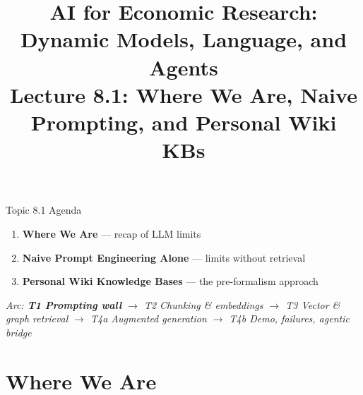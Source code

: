 


\usetikzlibrary{arrows.meta, positioning, shapes.geometric, fit, calc, backgrounds, decorations.pathreplacing}

\graphicspath{{./pic/}{./figures/}{../../MiniCourse_8hr/Slides/Module4_Agentic_AI/pic/}{../}}

\title[AI for Econ Research]{AI for Economic Research: Dynamic Models, Language, and Agents\\
Lecture 8.1: Where We Are, Naive Prompting, and Personal Wiki KBs}



\makebeamertitle

\begin{frame}{Topic 8.1 Agenda}
\begin{enumerate}
  \item \textbf{Where We Are} --- recap of LLM limits
  \medskip
  \item \textbf{Naive Prompt Engineering Alone} --- limits without retrieval
  \medskip
  \item \textbf{Personal Wiki Knowledge Bases} --- the pre-formalism approach
\end{enumerate}

\medskip
\textit{Arc: \textbf{T1 Prompting wall} $\to$ T2 Chunking \& embeddings $\to$ T3 Vector \& graph retrieval $\to$ T4a Augmented generation $\to$ T4b Demo, failures, agentic bridge}
\end{frame}

\section{Where We Are}


